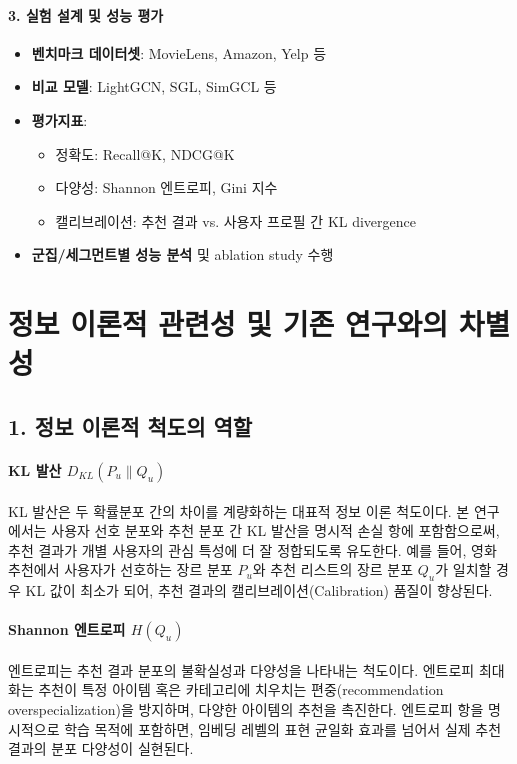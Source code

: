 \documentclass[a4paper, 12pt]{article}
\begin{document}
\paragraph{3. 실험 설계 및 성능 평가}
\begin{itemize}
    \item \textbf{벤치마크 데이터셋}: MovieLens, Amazon, Yelp 등
    \item \textbf{비교 모델}: LightGCN, SGL, SimGCL 등
    \item \textbf{평가지표}:
        \begin{itemize}
            \item 정확도: Recall@K, NDCG@K
            \item 다양성: Shannon 엔트로피, Gini 지수
            \item 캘리브레이션: 추천 결과 vs. 사용자 프로필 간 KL divergence
        \end{itemize}
    \item \textbf{군집/세그먼트별 성능 분석} 및 ablation study 수행
\end{itemize}

\newpage

\section*{정보 이론적 관련성 및 기존 연구와의 차별성}

\subsection*{1. 정보 이론적 척도의 역할}

\paragraph{KL 발산 $D_{KL}(P_u \| Q_u)$}
KL 발산은 두 확률분포 간의 차이를 계량화하는 대표적 정보 이론 척도이다. 본 연구에서는 사용자 선호 분포와 추천 분포 간 KL 발산을 명시적 손실 항에 포함함으로써, 추천 결과가 개별 사용자의 관심 특성에 더 잘 정합되도록 유도한다. 예를 들어, 영화 추천에서 사용자가 선호하는 장르 분포 $P_u$와 추천 리스트의 장르 분포 $Q_u$가 일치할 경우 KL 값이 최소가 되어, 추천 결과의 캘리브레이션(Calibration) 품질이 향상된다.

\paragraph{Shannon 엔트로피 $H(Q_u)$}
엔트로피는 추천 결과 분포의 불확실성과 다양성을 나타내는 척도이다. 엔트로피 최대화는 추천이 특정 아이템 혹은 카테고리에 치우치는 편중(recommendation overspecialization)을 방지하며, 다양한 아이템의 추천을 촉진한다. 엔트로피 항을 명시적으로 학습 목적에 포함하면, 임베딩 레벨의 표현 균일화 효과를 넘어서 실제 추천 결과의 분포 다양성이 실현된다.
\end{document}
